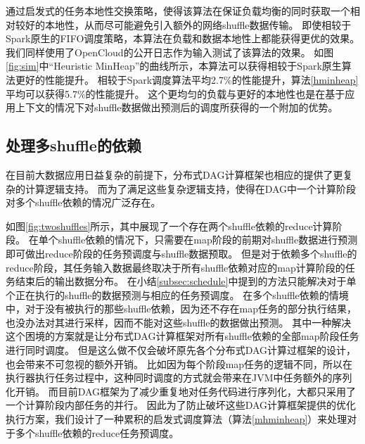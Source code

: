 通过启发式的任务本地性交换策略，使得该算法在保证负载均衡的同时获取一个相对较好的本地性，从而尽可能避免引入额外的网络shuffle数据传输。
即使相较于Spark原生的FIFO调度策略\cite{sparksource}，本算法在负载和数据本地性上都能获得更优的效果。
我们同样使用了OpenCloud的公开日志作为输入测试了该算法的效果。
如图\ref{fig:sim}中“Heuristic MinHeap”的曲线所示，本算法可以获得相较于Spark原生算法更好的性能提升。
相较于Spark调度算法平均2.7\%的性能提升，算法\ref{hminheap}平均可以获得5.7\%的性能提升。
这个更均匀的负载与更好的本地性也是在基于应用上下文的情况下对shuffle数据做出预测后的调度所获得的一个附加的优势。

\subsection{处理多shuffle的依赖}

在目前大数据应用日益复杂的前提下，分布式DAG计算框架也相应的提供了更复杂的计算逻辑支持。
而为了满足这些复杂逻辑支持，使得在DAG中一个计算阶段对多个shuffle依赖的情况广泛存在。

如图\ref{fig:twoshuffles}所示，其中展现了一个存在两个shuffle依赖的reduce计算阶段。
在单个shuffle依赖的情况下，只需要在map阶段的前期对shuffle数据进行预测即可做出reduce阶段的任务预调度与shuffle数据预取。
但是对于依赖多个shuffle的reduce阶段，其任务输入数据最终取决于所有shuffle依赖对应的map计算阶段的任务结束后的输出数据分布。
在小结\ref{subsec:schedule}中提到的方法只能解决对于单个正在执行的shuffle的数据预测与相应的任务预调度。
在多个shuffle依赖的情境中，对于没有被执行的那些shuffle依赖，因为还不存在map任务的部分执行结果，也没办法对其进行采样，因而不能对这些shuffle的数据做出预测。
其中一种解决这个困境的方案就是让分布式DAG计算框架对所有shuffle依赖的全部map阶段任务进行同时调度。
但是这么做不仅会破坏原先各个分布式DAG计算过框架的设计，也会带来不可忽视的额外开销。
比如因为每个阶段map任务的逻辑不同，所以在执行器执行任务过程中，这种同时调度的方式就会带来在JVM中任务额外的序列化开销。
而目前DAG框架为了减少重复地对任务代码进行序列化，大都只采用了一个计算阶段内部任务的并行。
因此为了防止破坏这些DAG计算框架提供的优化执行方案，我们设计了一种累积的启发式调度算法（算法\ref{mhminheap}）来处理对于多个shuffle依赖的reduce任务预调度。

